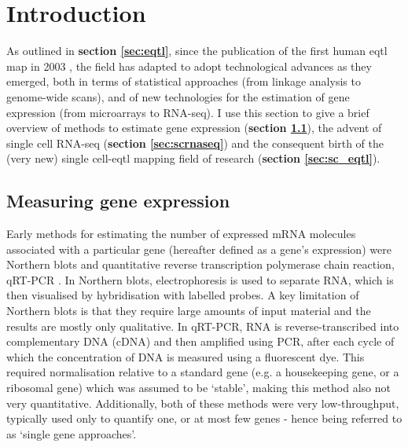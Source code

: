 \newpage

\section{Introduction}

As outlined in \textbf{section \ref{sec:eqtl}}, since the publication of the first human \gls{eqtl} map in 2003 \cite{schadt2003genetics}, the field has adapted to adopt technological advances as they emerged, both in terms of statistical approaches (from linkage analysis to genome-wide scans), and of new technologies for the estimation of gene expression (from microarrays to RNA-seq).
I use this section to give a brief overview of methods to estimate gene expression (\textbf{section \ref{sec:gene_expression}}), the advent of single cell RNA-seq (\textbf{section \ref{sec:scrnaseq}}) and the consequent birth of the (very new) single cell-\gls{eqtl} mapping field of research (\textbf{section \ref{sec:sc_eqtl}}). 

\subsection{Measuring gene expression}
\label{sec:gene_expression}

Early methods for estimating the number of expressed mRNA molecules associated with a particular gene (hereafter defined as a gene's expression) were Northern blots \cite{alwine1977method} and quantitative reverse transcription polymerase chain reaction, qRT-PCR \cite{gibson1996novel}. 
In Northern blots, electrophoresis is used to separate RNA, which is then visualised by hybridisation with labelled probes. 
A key limitation of Northern blots is that they require large amounts of input material and the results are mostly only qualitative.
In qRT-PCR, RNA is reverse-transcribed into complementary DNA (cDNA) and then amplified using PCR, after each cycle of which the concentration of DNA is measured using a fluorescent dye. 
This required normalisation relative to a standard gene (e.g. a housekeeping gene, or a ribosomal gene) which was assumed to be `stable', making this method also not very quantitative.
Additionally, both of these methods were very low-throughput, typically used only to quantify one, or at most few genes - hence being referred to as `single gene approaches'.
\\

